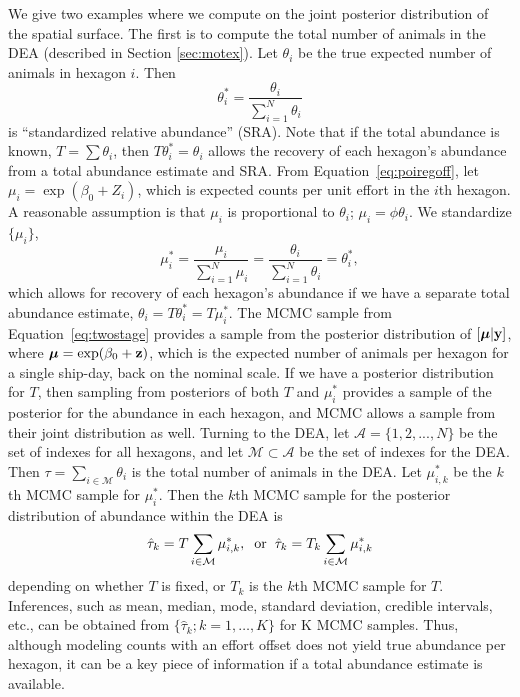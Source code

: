 \documentclass[11pt, titlepage]{article}
\begin{document}
\begin{spacing}{1.9}
\begin{flushleft}
We give two examples where we compute on the joint posterior distribution of the spatial surface.  The first is to compute the total number of animals in the DEA (described in Section \ref{sec:motex}). Let $\theta_{i}$ be the true expected number of animals in hexagon $i$.  Then
\[
\theta^{*}_{i} = \frac{\theta_{i}}{\sum_{i=1}^{N}\theta_{i}}
\]
is ``standardized relative abundance'' (SRA). Note that if the total abundance is known, $T = \sum \theta_{i}$, then $T\theta^{*}_{i} = \theta_{i}$ allows the recovery of each hexagon's abundance from a total abundance estimate and SRA. From Equation~\eqref{eq:poiregoff}, let $\mu_{i} =\exp(\beta_{0} + Z_{i})$, which is expected counts per unit effort in the $i$th hexagon. A reasonable assumption is that $\mu_{i}$ is proportional to $\theta_{i}$; $\mu_{i} = \phi\theta_{i}$.  We standardize $\{\mu_i\}$,
\begin{equation} \label{eq:mu_star}
\mu^{*}_{i} = \frac{\mu_{i}}{\sum_{i=1}^{N}\mu_{i}}  = \frac{\theta_{i}}{\sum_{i=1}^{N}\theta_{i}} = \theta_{i}^{*},
\end{equation}
which allows for recovery of each hexagon's abundance if we have a separate total abundance estimate, $\theta_{i} = T\theta^{*}_{i} = T\mu^{*}_{i}$.  The MCMC sample from Equation~\eqref{eq:twostage} provides a sample from the posterior distribution of $[\mbox{\boldmath $\mu$}|\mathbf{y}]$, where $\mbox{\boldmath $\mu$} = \exp(\beta_{0} + \mathbf{z})$, which is the expected number of animals per hexagon for a single ship-day, back on the nominal scale. If we have a posterior distribution for $T$, then sampling from posteriors of both $T$ and $\mu^{*}_{i}$ provides a sample of the posterior for the abundance in each hexagon, and MCMC allows a sample from their joint distribution as well. Turning to the DEA, let $\mathcal{A} = \{1,2,...,N\}$ be the set of indexes for all hexagons, and let $\mathcal{M} \subset \mathcal{A}$ be the set of indexes for the DEA. Then $\tau = \sum_{i \in \mathcal{M}} \theta_{i}$ is the total number of animals in the DEA. Let $\mu^{*}_{i,k}$ be the $k$th MCMC sample for $\mu^{*}_{i}$.  Then the $k$th MCMC sample for the posterior distribution of abundance within the DEA is
\begin{equation} \label{eq:spexlicitabu}
\hat{\tau}_{k} = T\sum_{i \in \mathcal{M}}\mu^{*}_{i,k}, \hspace{.2cm} \textrm{or} \hspace{.2cm}\hat{\tau}_{k}= T_{k}\sum_{i \in \mathcal{M}}\mu^{*}_{i,k}
\end{equation}
depending on whether $T$ is fixed, or $T_{k}$ is the $k$th MCMC sample for $T$. Inferences, such as mean, median, mode, standard deviation, credible intervals, etc., can be obtained from $\{\hat{\tau}_{k}; k = 1,\ldots,K\}$ for K MCMC samples. Thus, although modeling counts with an effort offset does not yield true abundance per hexagon, it can be a key piece of information if a total abundance estimate is available. 


\end{flushleft}
\end{spacing}
\end{document}
